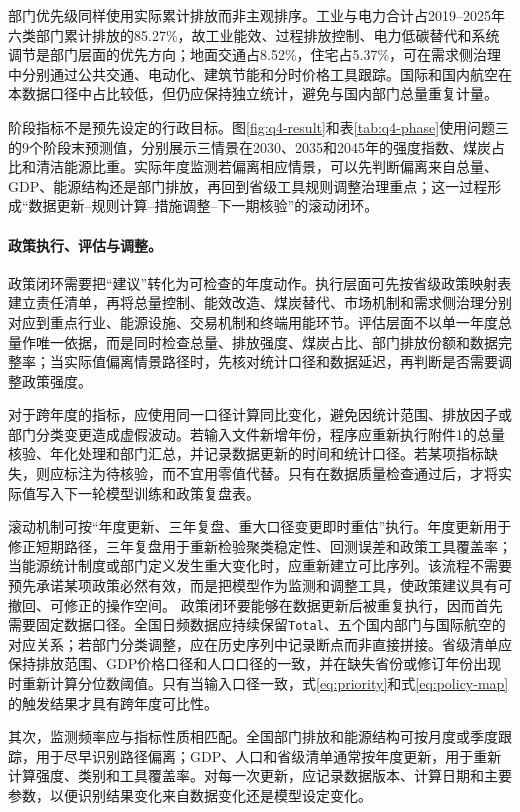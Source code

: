 \documentclass[12pt,a4paper]{ctexart}
\theoremstyle{definition}
\theoremstyle{plain}
\theoremstyle{remark}
\begin{document}
部门优先级同样使用实际累计排放而非主观排序。工业与电力合计占2019--2025年六类部门累计排放的85.27\%，故工业能效、过程排放控制、电力低碳替代和系统调节是部门层面的优先方向；地面交通占8.52\%，住宅占5.37\%，可在需求侧治理中分别通过公共交通、电动化、建筑节能和分时价格工具跟踪。国际和国内航空在本数据口径中占比较低，但仍应保持独立统计，避免与国内部门总量重复计量。

阶段指标不是预先设定的行政目标。图\ref{fig:q4-result}和表\ref{tab:q4-phase}使用问题三的9个阶段末预测值，分别展示三情景在2030、2035和2045年的强度指数、煤炭占比和清洁能源比重。实际年度监测若偏离相应情景，可以先判断偏离来自总量、GDP、能源结构还是部门排放，再回到省级工具规则调整治理重点；这一过程形成“数据更新--规则计算--措施调整--下一期核验”的滚动闭环。
\paragraph{政策执行、评估与调整。}
政策闭环需要把“建议”转化为可检查的年度动作。执行层面可先按省级政策映射表建立责任清单，再将总量控制、能效改造、煤炭替代、市场机制和需求侧治理分别对应到重点行业、能源设施、交易机制和终端用能环节。评估层面不以单一年度总量作唯一依据，而是同时检查总量、排放强度、煤炭占比、部门排放份额和数据完整率；当实际值偏离情景路径时，先核对统计口径和数据延迟，再判断是否需要调整政策强度。

对于跨年度的指标，应使用同一口径计算同比变化，避免因统计范围、排放因子或部门分类变更造成虚假波动。若输入文件新增年份，程序应重新执行附件1的总量核验、年化处理和部门汇总，并记录数据更新的时间和统计口径。若某项指标缺失，则应标注为待核验，而不宜用零值代替。只有在数据质量检查通过后，才将实际值写入下一轮模型训练和政策复盘表。

滚动机制可按“年度更新、三年复盘、重大口径变更即时重估”执行。年度更新用于修正短期路径，三年复盘用于重新检验聚类稳定性、回测误差和政策工具覆盖率；当能源统计制度或部门定义发生重大变化时，应重新建立可比序列。该流程不需要预先承诺某项政策必然有效，而是把模型作为监测和调整工具，使政策建议具有可撤回、可修正的操作空间。
政策闭环要能够在数据更新后被重复执行，因而首先需要固定数据口径。全国日频数据应持续保留\texttt{Total}、五个国内部门与国际航空的对应关系；若部门分类调整，应在历史序列中记录断点而非直接拼接。省级清单应保持排放范围、GDP价格口径和人口口径的一致，并在缺失省份或修订年份出现时重新计算分位数阈值。只有当输入口径一致，式\eqref{eq:priority}和式\eqref{eq:policy-map}的触发结果才具有跨年度可比性。

其次，监测频率应与指标性质相匹配。全国部门排放和能源结构可按月度或季度跟踪，用于尽早识别路径偏离；GDP、人口和省级清单通常按年度更新，用于重新计算强度、类别和工具覆盖率。对每一次更新，应记录数据版本、计算日期和主要参数，以便识别结果变化来自数据变化还是模型设定变化。
\end{document}
